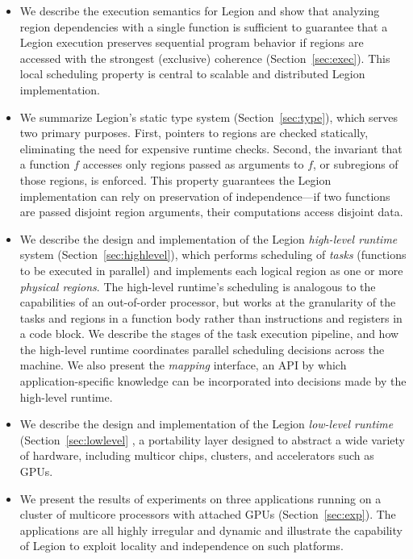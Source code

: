 \documentclass[9pt,nocopyrightspace]{sigplanconf}
\begin{document}
\begin{itemize}

\item We describe the execution semantics for Legion and show that 
analyzing region dependencies with a single function is sufficient to 
guarantee that a Legion execution preserves sequential program
behavior if regions are accessed with the strongest (exclusive)
coherence (Section~\ref{sec:exec}).  This local scheduling property is central to 
scalable and distributed Legion implementation.

\item We summarize Legion's static type system (Section~\ref{sec:type}), which serves two primary
  purposes.  First, pointers to regions are checked
  statically, eliminating the need for expensive runtime checks.
  Second, the invariant that a function $f$ accesses only
  regions passed as arguments to $f$, or subregions of those regions, is enforced.
  This property guarantees the Legion implementation can rely on
  preservation of independence---if two functions are passed disjoint
  region arguments, their computations access disjoint
data.  

\item We describe the design and implementation of the Legion {\em high-level runtime}
system (Section~\ref{sec:highlevel}), which performs scheduling of {\em tasks} (functions to be executed in parallel)
and implements each logical region as one or more {\em physical regions}.
The high-level runtime's scheduling is analogous to the capabilities of an out-of-order processor,
but works at the granularity of the tasks and regions in a function body rather than instructions and registers
in a code block.  We describe the stages of the task execution pipeline, and how the high-level runtime coordinates parallel
scheduling decisions across the machine.  We also present the {\em mapping} interface, an API by which
application-specific knowledge can be incorporated into decisions made by the high-level runtime.

\item We describe the design and implementation of the Legion {\em low-level runtime} (Section~\ref{sec:lowlevel} ,
a portability layer designed to abstract a wide variety of hardware, including multicor chips, clusters, and accelerators
such as GPUs. 

\item We present the results of experiments on three applications running on a cluster of multicore processors with
attached GPUs (Section~\ref{sec:exp}).  The applications are all highly irregular and dynamic and illustrate the capability of Legion to 
exploit locality and independence on such platforms.

\end{itemize}
















{
\small

}
\end{document}
